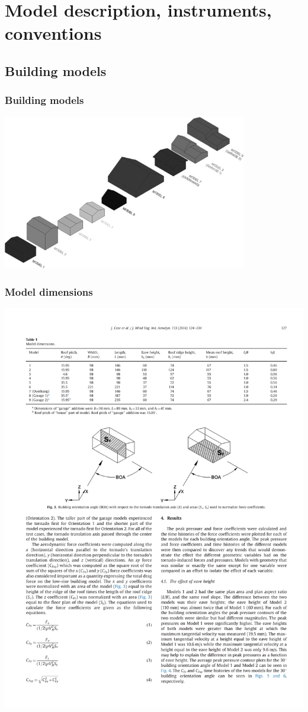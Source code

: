 \documentclass{beamer}
\begin{document}
\section{Model description, instruments,  conventions}
\subsection{Building models}
\begin{frame}
	\frametitle{Building models}
	\includegraphics[width=0.8\textwidth]{./fig/2.jpg}
\end{frame}
\begin{frame}
	\frametitle{Model dimensions}
	\includegraphics[width=\textwidth]{./fig/model_dimension.pdf}
\end{frame}
\end{document}
